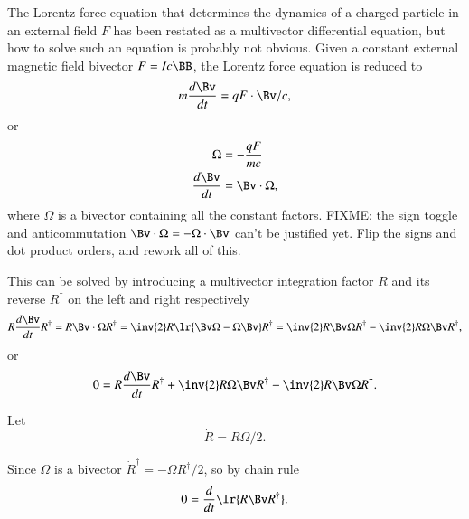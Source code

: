 %
%

The Lorentz force equation that determines the dynamics of a charged particle in an external field \( F \) has been restated as a multivector differential equation, but how to solve such an equation is probably not obvious.
Given a constant external magnetic field bivector \( F = I c \BB \), the Lorentz force equation is reduced to
\begin{dmath}\label{eqn:lorentzForce_constantMagnetic:60}
m \frac{d\Bv}{dt} = q F \cdot \Bv/c,
\end{dmath}
or
\begin{dmath}\label{eqn:lorentzForce_constantMagnetic:80}
\begin{aligned}
\Omega &= -\frac{q F}{m c} \\
\frac{d\Bv}{dt} &= \Bv \cdot \Omega,
\end{aligned}
\end{dmath}
where \( \Omega \) is a bivector containing all the constant factors.
FIXME: the sign toggle and anticommutation \( \Bv \cdot \Omega = - \Omega \cdot \Bv \) can't be justified yet.  Flip the signs and dot product orders, and
rework all of this.

This can be solved by introducing a multivector integration factor \( R \) and its reverse \( R^\dagger \) on the left and right respectively
\begin{dmath}\label{eqn:lorentzForce_constantMagnetic:100}
R \frac{d\Bv}{dt} R^\dagger
= R \Bv \cdot \Omega R^\dagger
= \inv{2} R \lr{ \Bv \Omega - \Omega \Bv} R^\dagger
= \inv{2} R \Bv \Omega R^\dagger - \inv{2} R \Omega \Bv R^\dagger,
\end{dmath}
or
\begin{dmath}\label{eqn:lorentzForce_constantMagnetic:120}
0 =
R \frac{d\Bv}{dt} R^\dagger
+ \inv{2} R \Omega \Bv R^\dagger
- \inv{2} R \Bv \Omega R^\dagger.
\end{dmath}

Let
\begin{dmath}\label{eqn:lorentzForce_constantMagnetic:140}
\dot{R} = R \Omega/2.
\end{dmath}

Since \( \Omega \) is a bivector \( \dot{R}^\dagger = -\Omega R^\dagger/2 \), so by chain rule
\begin{dmath}\label{eqn:lorentzForce_constantMagnetic:160}
0
=
\frac{d}{dt} \lr{
R \Bv R^\dagger
}.
\end{dmath}

